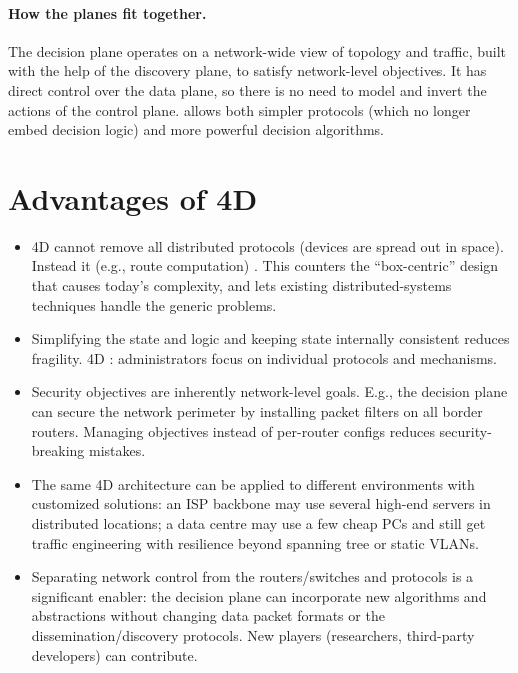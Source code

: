 \paragraph{How the planes fit together.} The decision plane operates on a network-wide view of topology and traffic, built with the help of the discovery plane, to satisfy network-level objectives. It has direct control over the data plane, so there is no need to model and invert the actions of the control plane.  allows both simpler protocols (which no longer embed decision logic) and more powerful decision algorithms.

\section{Advantages of 4D}
\begin{itemize}
\item {} 4D cannot remove all distributed protocols (devices are spread out in space). Instead it  (e.g., route computation) . This counters the ``box-centric'' design that causes today's complexity, and lets existing distributed-systems techniques handle the generic problems.
\item {} Simplifying the state and logic and keeping state internally consistent reduces fragility. 4D : administrators focus on  individual protocols and mechanisms.
\item {} Security objectives are inherently network-level goals. E.g., the decision plane can secure the network perimeter by installing packet filters on all border routers. Managing objectives instead of per-router configs reduces security-breaking mistakes.
\item {} The same 4D architecture can be applied to different environments with customized solutions: an ISP backbone may use several high-end servers in distributed locations; a data centre may use a few cheap PCs and still get traffic engineering with resilience beyond spanning tree or static VLANs.
\item {} Separating network control from the routers/switches and protocols is a significant enabler: the decision plane can incorporate new algorithms and abstractions without changing data packet formats or the dissemination/discovery protocols. New players (researchers, third-party developers) can contribute.
\end{itemize}

